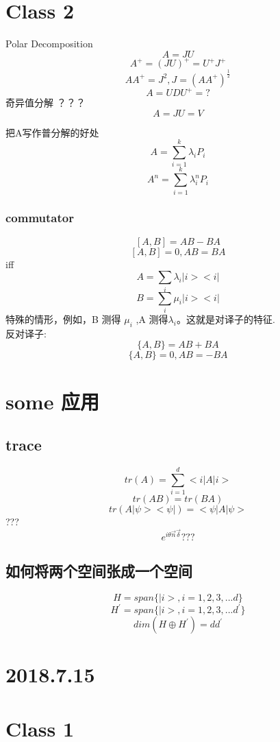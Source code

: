 \documentclass[a4paper, 11pt]{article} %
\begin{document}
\section*{Class 2}
Polar Decomposition
$$
A = JU 
$$
$$
A^{+} = (JU)^{+} = U^{+}J^{+} 
$$
$$
AA^{+} = J^2, J = (AA^{+})^{\frac{1}{2}}
$$
$$
A = UDU^{+} = ?
$$
奇异值分解 ？？？ 
$$
A = JU = V
$$

把A写作普分解的好处
$$
A = \sum_{i = 1}^k \lambda_iP_i
$$
$$
A^n = \sum_{i = 1}^k \lambda_i^nP_i
$$
\subsubsection*{commutator}
$$
[A,B] = AB - BA
$$
$$
[A,B]  =0, AB = BA
$$
iff
$$
A = \sum_i \lambda_i|i><i|
$$
$$
B = \sum_i \mu_i |i><i|
$$
特殊的情形，例如，B 测得 $\mu_i$ ,A 测得$\lambda_i$。这就是对译子的特征.\\

反对译子:
$$
\lbrace A,B \rbrace = AB+BA
$$
$$
\lbrace A,B \rbrace = 0, AB = -BA
$$

\section*{some 应用}
\subsection*{trace}
$$
tr(A) = \sum_{i = 1}^d <i|A|i>
$$
$$
tr(AB) = tr(BA)
$$
$$
tr(A|\psi><\psi|) = <\psi|A|\psi>
$$
???
$$
e^{i\theta \overrightarrow{n} \overrightarrow{\delta}} ???
$$

\subsection{如何将两个空间张成一个空间}
$$
H = span \lbrace |i> , i = 1,2,3,...d \rbrace
$$
$$
H^{'} = span \lbrace |i> , i = 1,2,3,...d^{'} \rbrace
$$
$$
dim(H \oplus H^{'}) = dd^{'}
$$

\clearpage
\section*{2018.7.15}
\section*{Class 1}


\end{document}

